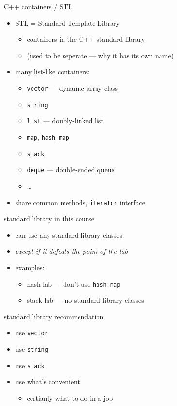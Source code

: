 \begin{frame}{C++ containers / STL}
    \begin{itemize}
    \item STL = Standard Template Library
        \begin{itemize}
        \item containers in the C++ standard library
        \item (used to be seperate --- why it has its own name)
        \end{itemize}
    \item many list-like containers:
        \begin{itemize}
        \item \texttt{vector} --- dynamic array class
        \item \texttt{string}
        \item \texttt{list} --- doubly-linked list
        \item \texttt{map}, \texttt{hash\_map}
        \item \texttt{stack}
        \item \texttt{deque} --- double-ended queue
        \item \ldots
        \end{itemize}
    \item share common methods, \texttt{iterator} interface
    \end{itemize}
\end{frame}

\begin{frame}{standard library in this course}
    \begin{itemize}
    \item can use any standard library classes
    \item \textit{except if it defeats the point of the lab}
    \item examples:
        \begin{itemize}
        \item hash lab --- don't use \texttt{hash\_map}
        \item stack lab --- no standard library classes
        \end{itemize}
    \end{itemize}
\end{frame}

\begin{frame}{standard library recommendation}
    \begin{itemize}
        \item use \texttt{vector}
        \item use \texttt{string}
        \item use \texttt{stack}
        \item use what's convenient
            \begin{itemize}
            \item certianly what to do in a job
            \end{itemize}
    \end{itemize}
\end{frame}

